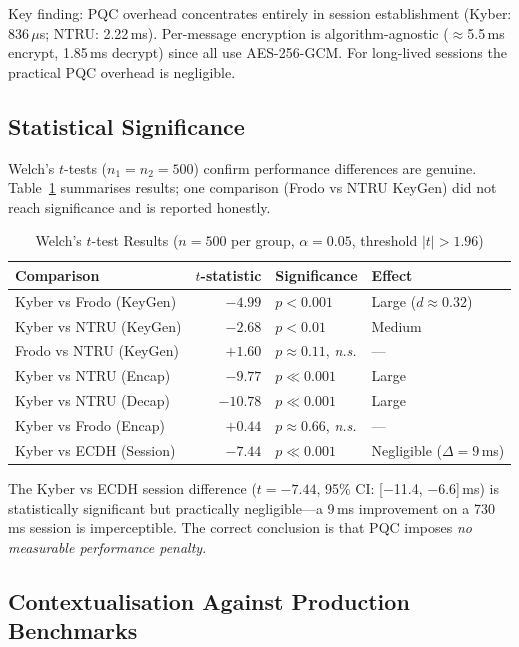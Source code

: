 \documentclass[11pt,a4paper]{article}
\begin{document}
Key finding: PQC overhead concentrates entirely in session establishment (Kyber: 836\,$\mu$s; NTRU: 2.22\,ms). Per-message encryption is algorithm-agnostic (${\approx}$5.5\,ms encrypt, 1.85\,ms decrypt) since all use AES-256-GCM. For long-lived sessions the practical PQC overhead is negligible.

\subsection{Statistical Significance}

Welch's $t$-tests ($n_1=n_2=500$) confirm performance differences are genuine. Table~\ref{tab:ttests} summarises results; one comparison (Frodo vs NTRU KeyGen) did not reach significance and is reported honestly.

\begin{table}[H]
\centering\small
\caption{Welch's $t$-test Results ($n=500$ per group, $\alpha=0.05$, threshold $|t|>1.96$)}
\label{tab:ttests}
\begin{tabular}{l|r|l|l}
\toprule
\textbf{Comparison} & \textbf{$t$-statistic} & \textbf{Significance} & \textbf{Effect} \\
\midrule
Kyber vs Frodo (KeyGen)    & $-4.99$ & $p<0.001$ & Large ($d\approx0.32$) \\
Kyber vs NTRU (KeyGen)     & $-2.68$ & $p<0.01$  & Medium \\
Frodo vs NTRU (KeyGen)     & $+1.60$ & $p\approx0.11$, \textit{n.s.} & --- \\
Kyber vs NTRU (Encap)      & $-9.77$ & $p\ll0.001$ & Large \\
Kyber vs NTRU (Decap)      & $-10.78$& $p\ll0.001$ & Large \\
Kyber vs Frodo (Encap)     & $+0.44$ & $p\approx0.66$, \textit{n.s.} & --- \\
Kyber vs ECDH (Session)    & $-7.44$ & $p\ll0.001$ & Negligible ($\Delta=9$\,ms) \\
\bottomrule
\end{tabular}
\end{table}

The Kyber vs ECDH session difference ($t=-7.44$, 95\% CI: [$-$11.4, $-$6.6]\,ms) is statistically significant but practically negligible---a 9\,ms improvement on a 730\,ms session is imperceptible. The correct conclusion is that PQC imposes \emph{no measurable performance penalty}.

\subsection{Contextualisation Against Production Benchmarks}
\end{document}
